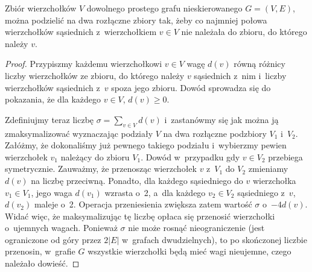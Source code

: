 \subproblem %
\begin{twierdzenie}
	Zbiór wierzchołków $V$ dowolnego prostego grafu nieskierowanego $G=(V,E)$, można podzielić na dwa rozłączne zbiory tak, żeby co najmniej połowa wierzchołków sąsiednich z~wierzchołkiem $v\in V$ nie należała do zbioru, do którego należy $v$.
\end{twierdzenie}
\begin{proof}
Przypiszmy każdemu wierzchołkowi $v\in V$ wagę $d(v)$ równą różnicy liczby wierzchołków ze zbioru, do którego należy $v$ sąsiednich z~nim i~liczby wierzchołków sąsiednich z~$v$ spoza jego zbioru. Dowód sprowadza się do pokazania, że dla każdego $v\in V$\!, $d(v)\ge0$.

Zdefiniujmy teraz liczbę $\sigma=\sum_{v\in V}d(v)$ i~zastanówmy się jak można ją zmaksymalizować wyznaczając podziały $V$ na dwa rozłączne podzbiory $V_1$ i~$V_2$. Załóżmy, że dokonaliśmy już pewnego takiego podziału i~wybierzmy pewien wierzchołek $v_1$ należący do zbioru $V_1$. Dowód w~przypadku gdy $v\in V_2$ przebiega symetrycznie. Zauważmy, że przenosząc wierzchołek $v$ z~$V_1$ do $V_2$ zmieniamy $d(v)$ na liczbę przeciwną. Ponadto, dla każdego sąsiedniego do $v$ wierzchołka $v_1\in V_1$, jego waga $d(v_1)$ wzrasta o~2, a~dla każdego $v_2\in V_2$ sąsiedniego z~$v$, $d(v_2)$ maleje o~2. Operacja przeniesienia zwiększa zatem wartość $\sigma$ o~$-4d(v)$. Widać więc, że maksymalizując tę liczbę opłaca się przenosić wierzchołki o~ujemnych wagach. Ponieważ $\sigma$ nie może rosnąć nieograniczenie (jest ograniczone od góry przez $2|E|$ w~grafach dwudzielnych), to po skończonej liczbie przenosin, w~grafie $G$ wszystkie wierzchołki będą mieć wagi nieujemne, czego należało dowieść.
\end{proof}

